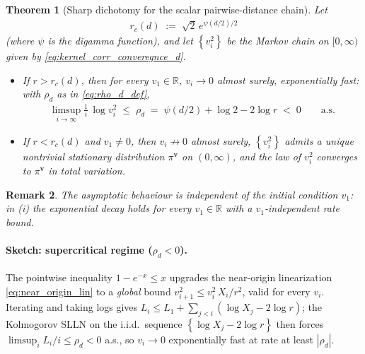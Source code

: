 \documentclass{article}
\newcommand{\RR}{\mathbb{R}}
\newcommand{\Set}[1]{\left\{ #1 \right\}}
\newtheorem{theorem}{Theorem}[section]
\newtheorem{remark}[theorem]{Remark}
\newcommand{\bv}{\mathbf{v}}
\begin{document}
\begin{theorem}[Sharp dichotomy for the scalar pairwise-distance chain]
  \label{thm:sync_v_convergence_d}
  Let
  \begin{eqnarray*}
    r_c(d) \;:=\; \sqrt{2}\, e^{\psi(d/2)/2}
  \end{eqnarray*}
  (where $\psi$ is the digamma function), and let $\Set{v_i^2}$ be the Markov chain on $[0, \infty)$ given by \eqref{eq:kernel_corr_converegnce_d}.
  \begin{itemize}
    \item[(i)] If $r > r_c(d)$, then for every $v_1 \in \RR$, $v_i \to 0$ almost surely, exponentially fast: with $\rho_d$ as in \eqref{eq:rho_d_def},
      \begin{eqnarray*}
        \limsup_{i \to \infty} \frac{1}{i}\, \log v_i^2 \;\le\; \rho_d \;=\; \psi(d/2) + \log 2 - 2\log r \;<\; 0 \qquad \text{a.s.}
      \end{eqnarray*}
    \item[(ii)] If $r < r_c(d)$ and $v_1 \ne 0$, then $v_i \not\to 0$ almost surely, $\Set{v_i^2}$ admits a unique nontrivial stationary distribution $\pi^{\bv}$ on $(0, \infty)$, and the law of $v_i^2$ converges to $\pi^{\bv}$ in total variation.
  \end{itemize}
\end{theorem}

\begin{remark}
  \label{rem:sync_initial_condition}
  The asymptotic behaviour is independent of the initial condition $v_1$: in (i) the exponential decay holds for every $v_1 \in \RR$ with a $v_1$-independent rate bound.
\end{remark}

\paragraph{Sketch: supercritical regime ($\rho_d < 0$).}
The pointwise inequality $1 - e^{-x} \le x$ upgrades the near-origin linearization \eqref{eq:near_origin_lin} to a \emph{global} bound $v_{i+1}^2 \le v_i^2\, X_i / r^2$, valid for every $v_i$. Iterating and taking logs gives $L_i \le L_1 + \sum_{j<i}(\log X_j - 2\log r)$; the Kolmogorov SLLN on the i.i.d.\ sequence $\Set{\log X_j - 2\log r}$ then forces $\limsup_i L_i/i \le \rho_d < 0$ a.s., so $v_i \to 0$ exponentially fast at rate at least $|\rho_d|$.
\end{document}
